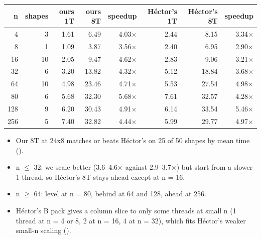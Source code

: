 \begin{center}\small
\begin{tabular}{@{}rr rrr rrr@{}}
\toprule
n & shapes & ours 1T & ours 8T & speedup & H\'ector's 1T & H\'ector's 8T & speedup \\
\midrule
4 & 3 & 1.61 & 6.49 & 4.03$\times$ & 2.44 & 8.15 & 3.34$\times$ \\
8 & 1 & 1.09 & 3.87 & 3.56$\times$ & 2.40 & 6.95 & 2.90$\times$ \\
16 & 10 & 2.05 & 9.47 & 4.62$\times$ & 2.83 & 9.06 & 3.21$\times$ \\
32 & 6 & 3.20 & 13.82 & 4.32$\times$ & 5.12 & 18.84 & 3.68$\times$ \\
64 & 10 & 4.98 & 23.46 & 4.71$\times$ & 5.53 & 27.54 & 4.98$\times$ \\
80 & 6 & 5.68 & 32.30 & 5.68$\times$ & 7.61 & 32.57 & 4.28$\times$ \\
128 & 9 & 6.20 & 30.43 & 4.91$\times$ & 6.14 & 33.54 & 5.46$\times$ \\
256 & 5 & 7.40 & 32.82 & 4.44$\times$ & 5.99 & 29.77 & 4.97$\times$ \\
\bottomrule
\end{tabular}
\end{center}

\begin{itemize}\setlength\itemsep{1pt}
\item Our 8T at 24x8 matches or beats H\'ector's on 25 of 50 shapes by mean time ().
\item n $\le$ 32: we scale better (3.6--4.6$\times$ against 2.9--3.7$\times$) but start from a slower 1 thread, so H\'ector's 8T stays ahead except at n = 16.
\item n $\ge$ 64: level at n = 80, behind at 64 and 128, ahead at 256.
\item H\'ector's B pack gives a column slice to only some threads at small n (1 thread at n = 4 or 8, 2 at n = 16, 4 at n = 32), which fits H\'ector's weaker small-n scaling ().
\end{itemize}

